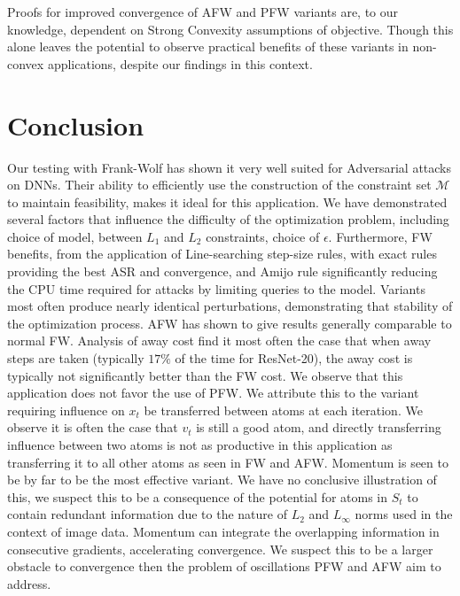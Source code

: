 \documentclass{article}
\begin{document}
Proofs for improved convergence of AFW and PFW variants are, to our knowledge, dependent on Strong Convexity assumptions of objective. Though this alone leaves the potential to observe practical benefits of these variants in non-convex applications, despite our findings in this context.

\section{Conclusion}
Our testing with Frank-Wolf has shown it very well suited for Adversarial attacks on DNNs. Their ability to efficiently use the construction of the constraint set $\mathcal{M}$ to maintain feasibility, makes it ideal for this application.
We have demonstrated several factors that influence the difficulty of the optimization problem, including choice of model,   between $L_1$ and $L_2$ constraints, choice of $\epsilon$. Furthermore, FW benefits, from the application of Line-searching step-size rules, with exact rules providing the best ASR and convergence, and Amijo rule significantly reducing the CPU time required for attacks by limiting queries to the model. 
Variants most often produce nearly identical perturbations, demonstrating that stability of the optimization process. 
AFW has shown to give results generally comparable to normal FW. Analysis of away cost find it most often the case that when away steps are taken (typically $17\%$ of the time for ResNet-20), the away cost is typically not significantly better than the FW cost. 
We observe that this application does not favor the use of PFW. We attribute this to the variant requiring influence on $x_t$ be transferred between atoms at each iteration. We observe it is often the case that $v_t$ is still a good atom, and directly transferring influence between two atoms is not as productive in this application as transferring it to all other atoms as seen in FW and AFW. 
Momentum is seen to be by far to be the most effective variant. We have no conclusive illustration of this, we suspect this to be a consequence of the potential for atoms in $S_t$ to contain redundant information due to the nature of $L_2$ and $L_\infty$ norms used in the context of image data. Momentum can integrate the overlapping information in consecutive gradients, accelerating convergence. We suspect this to be a larger obstacle to convergence then the problem of oscillations PFW and AFW aim to address.




\end{document}
